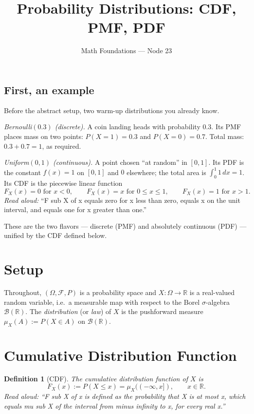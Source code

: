\documentclass[11pt]{article}
\title{Probability Distributions: CDF, PMF, PDF}
\author{Math Foundations --- Node 23}
\date{}
\newtheorem{definition}{Definition}
\begin{document}
\maketitle

\subsection*{First, an example}

Before the abstract setup, two warm-up distributions you already know.

\emph{Bernoulli$(0.3)$ (discrete).} A coin landing heads with probability $0.3$. Its PMF places mass on two points: $P(X = 1) = 0.3$ and $P(X = 0) = 0.7$. Total mass: $0.3 + 0.7 = 1$, as required.

\emph{Uniform$(0,1)$ (continuous).} A point chosen ``at random'' in $[0,1]$. Its PDF is the constant $f(x) = 1$ on $[0,1]$ and $0$ elsewhere; the total area is $\int_0^1 1\, dx = 1$. Its CDF is the piecewise linear function
\[ F_X(x) = 0 \text{ for } x < 0, \qquad F_X(x) = x \text{ for } 0 \le x \le 1, \qquad F_X(x) = 1 \text{ for } x > 1. \]
\emph{Read aloud:} ``F sub X of x equals zero for x less than zero, equals x on the unit interval, and equals one for x greater than one.''

These are the two flavors --- discrete (PMF) and absolutely continuous (PDF) --- unified by the CDF defined below.

\section{Setup}

Throughout, $(\Omega, \mathcal{F}, P)$ is a probability space and $X : \Omega \to \mathbb{R}$ is a real-valued random variable, i.e.\ a measurable map with respect to the Borel $\sigma$-algebra $\mathcal{B}(\mathbb{R})$. The \emph{distribution} (or \emph{law}) of $X$ is the pushforward measure $\mu_X(A) := P(X \in A)$ on $\mathcal{B}(\mathbb{R})$.

\section{Cumulative Distribution Function}

\begin{definition}[CDF]
The \emph{cumulative distribution function} of $X$ is
\[
F_X(x) := P(X \le x) = \mu_X((-\infty, x]), \qquad x \in \mathbb{R}.
\]
\emph{Read aloud:} ``F sub X of x is defined as the probability that X is at most x, which equals mu sub X of the interval from minus infinity to x, for every real x.''
\end{definition}
\end{document}
